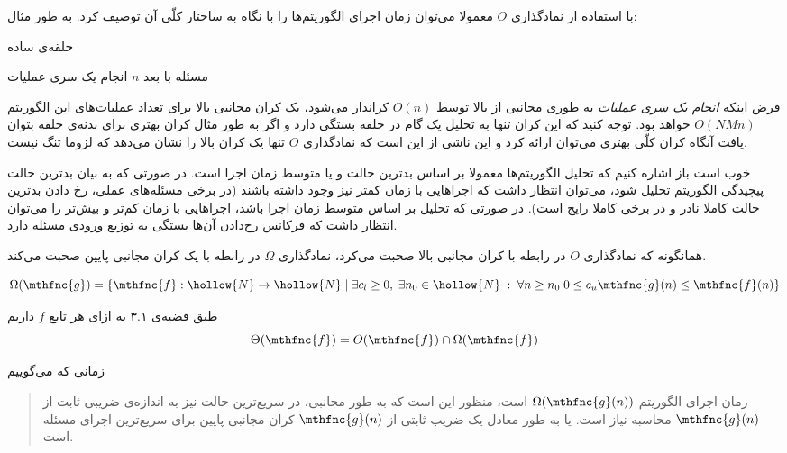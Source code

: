 
با استفاده از نمادگذاری 
$O$ 
معمولا می‌توان زمان اجرای الگوریتم‌ها را با نگاه به ساختار کلّی آن توصیف کرد. به طور مثال:
\begin{algorithm}[H]
\caption*{
حلقه‌ی ساده
}
\begin{algorithmic}[1]
\REQUIRE 
مسئله با بعد  
$n$
  \STATE 
  انجام یک سری عملیات
  \ENDFOR
  \ENDFOR
\end{algorithmic}
\end{algorithm}
فرض اینکه 
\textit{
انجام یک سری عملیات
} 
به طوری مجانبی از بالا توسط 
$O( n )$ 
کراندار می‌شود، یک کران مجانبی بالا برای تعداد عملیات‌های این الگوریتم 
$O( N  M n )$ 
خواهد بود. توجه کنید که این کران تنها به تحلیل یک گام در حلقه بستگی دارد و اگر به طور مثال کران بهتری برای بدنه‌ی حلقه بتوان یافت آنگاه کران کلّی بهتری می‌توان ارائه کرد و این ناشی از این است که نمادگذاری 
$O$ 
تنها یک کران بالا را نشان می‌دهد که لزوما تنگ نیست.


خوب است باز اشاره کنیم که تحلیل الگوریتم‌ها معمولا بر اساس بدترین حالت و یا متوسط زمان اجرا
است. در صورتی که به بیان بدترین حالت پیچیدگی الگوریتم تحلیل شود، می‌توان انتظار داشت که اجراهایی با زمان کمتر نیز وجود داشته باشند (در برخی مسئله‌های عملی، رخ دادن بدترین حالت کاملا نادر و در برخی کاملا رایج است). در صورتی که تحلیل بر اساس متوسط زمان اجرا باشد، اجراهایی با زمان کم‌تر و بیش‌تر را می‌توان انتظار داشت که فرکانس رخ‌دادن آن‌ها بستگی به توزیع ورودی مسئله دارد.


همانگونه که نمادگذاری 
$O$ 
در رابطه با کران مجانبی بالا صحبت می‌کرد، نمادگذاری 
$\Omega$ 
در رابطه با یک کران مجانبی پایین صحبت می‌کند.

\[
\Omega( \mthfnc{g} ) = \left\lbrace \mthfnc{f}: \hollow{N} \rightarrow \hollow{N} \;\vert\; \exists c_l \geq 0, \; \exists n_0 \in \hollow{N} \; : \; \forall n \geq n_0 \; 0 \leq c_u \mthfnc{g}(n) \leq \mthfnc{f}(n) \right\rbrace
\]

طبق قضیه‌ی ۳.۱
\cite{clrs2009} 
به ازای هر تابع 
$f$ 
داریم
\[
\Theta( \mthfnc{f} ) = O( \mthfnc{f} ) \cap \Omega( \mthfnc{f} )
\]


زمانی که می‌گوییم 
\begin{quote}
زمان اجرای الگوریتم 
$\Omega( \mthfnc{g}(n) )$ 
است، منظور این است که به طور مجانبی، در سریع‌ترین حالت نیز به اندازه‌ی ضریبی ثابت از 
$\mthfnc{g}(n)$ 
محاسبه نیاز است. یا به طور معادل یک ضریب ثابتی از 
$\mthfnc{g}(n)$ 
کران مجانبی پایین برای سریع‌ترین اجرای مسئله است.
\end{quote}

